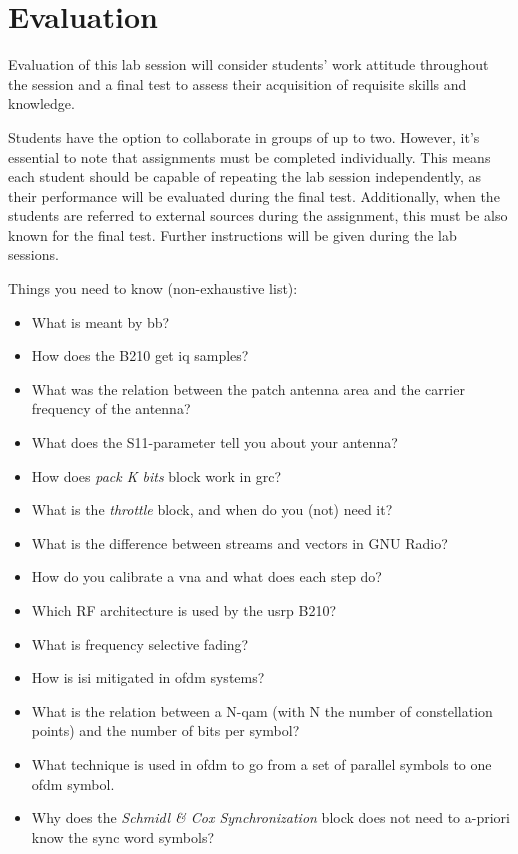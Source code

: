 \chapter{Evaluation}\glsresetall

Evaluation of this lab session will consider students' work attitude throughout the session and a final test to assess their acquisition of requisite skills and knowledge.

Students have the option to collaborate in groups of up to two. However, it's essential to note that assignments must be completed individually. This means each student should be capable of repeating the lab session independently, as their performance will be evaluated during the final test. Additionally, when the students are referred to external sources during the assignment, this must be also known for the final test.
Further instructions will be given during the lab sessions.

Things you need to know (non-exhaustive list):
\begin{itemize}
    \item What is meant by \gls{bb}?
    \item How does the B210 get \gls{iq} samples?
    \item What was the relation between the patch antenna area and the carrier frequency of the antenna?
    \item What does the S11-parameter tell you about your antenna?
    \item How does \textit{pack K bits} block work in \gls{grc}?
    \item What is the \textit{throttle} block, and when do you (not) need it?
    \item What is the difference between streams and vectors in GNU Radio?
    \item How do you calibrate a \gls{vna} and what does each step do?
    \item Which RF architecture is used by the \gls{usrp} B210?
    \item What is frequency selective fading?
    \item How is \gls{isi} mitigated in \gls{ofdm} systems?
    \item What is the relation between a N-\gls{qam} (with N the number of constellation points) and the number of bits per symbol?
    \item What technique is used in \gls{ofdm} to go from a set of parallel symbols to one \gls{ofdm} symbol.  
    \item Why does the \textit{Schmidl \& Cox Synchronization} block does not need to a-priori know the sync word symbols?
\end{itemize}
